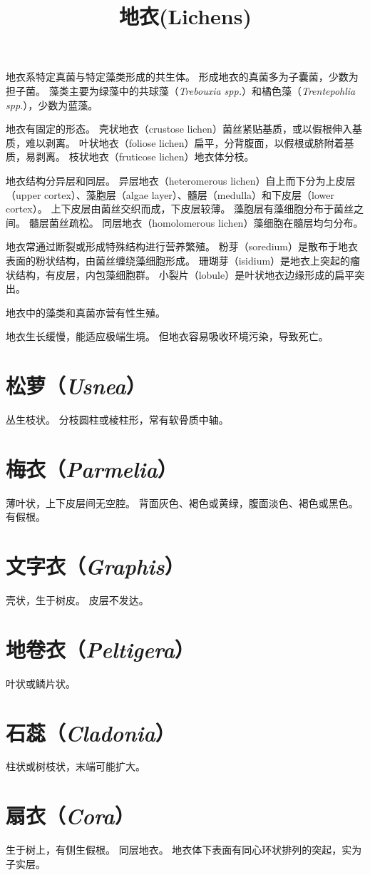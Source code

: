 \documentclass[11pt]{article}
\title{地衣(Lichens)}
\date{}
\begin{document}
  \maketitle

  \linenumbers
地衣系特定真菌与特定藻类形成的共生体。
形成地衣的真菌多为子囊菌，少数为担子菌。
藻类主要为绿藻中的共球藻（\textit{Trebouxia spp.}）和橘色藻（\textit{Trentepohlia spp.}），少数为蓝藻。

\newline

地衣有固定的形态。
壳状地衣（crustose lichen）菌丝紧贴基质，或以假根伸入基质，难以剥离。
叶状地衣（foliose lichen）扁平，分背腹面，以假根或脐附着基质，易剥离。
枝状地衣（fruticose lichen）地衣体分枝。

\newline

地衣结构分异层和同层。
异层地衣（heteromerous lichen）自上而下分为上皮层（upper cortex）、藻胞层（algae layer）、髓层（medulla）和下皮层（lower cortex）。
上下皮层由菌丝交织而成，下皮层较薄。
藻胞层有藻细胞分布于菌丝之间。
髓层菌丝疏松。
同层地衣（homolomerous lichen）藻细胞在髓层均匀分布。

\newline

地衣常通过断裂或形成特殊结构进行营养繁殖。
粉芽（soredium）是散布于地衣表面的粉状结构，由菌丝缠绕藻细胞形成。
珊瑚芽（isidium）是地衣上突起的瘤状结构，有皮层，内包藻细胞群。
小裂片（lobule）是叶状地衣边缘形成的扁平突出。

\newline

地衣中的藻类和真菌亦营有性生殖。

\newline

地衣生长缓慢，能适应极端生境。
但地衣容易吸收环境污染，导致死亡。

\section{松萝（\textit{Usnea}）}
丛生枝状。
分枝圆柱或棱柱形，常有软骨质中轴。

\section{梅衣（\textit{Parmelia}）}
薄叶状，上下皮层间无空腔。
背面灰色、褐色或黄绿，腹面淡色、褐色或黑色。
有假根。

\section{文字衣（\textit{Graphis}）}
壳状，生于树皮。
皮层不发达。

\section{地卷衣（\textit{Peltigera}）}
叶状或鳞片状。

\section{石蕊（\textit{Cladonia}）}
柱状或树枝状，末端可能扩大。

\section{扇衣（\textit{Cora}）}
生于树上，有侧生假根。
同层地衣。
地衣体下表面有同心环状排列的突起，实为子实层。
\end{document}
